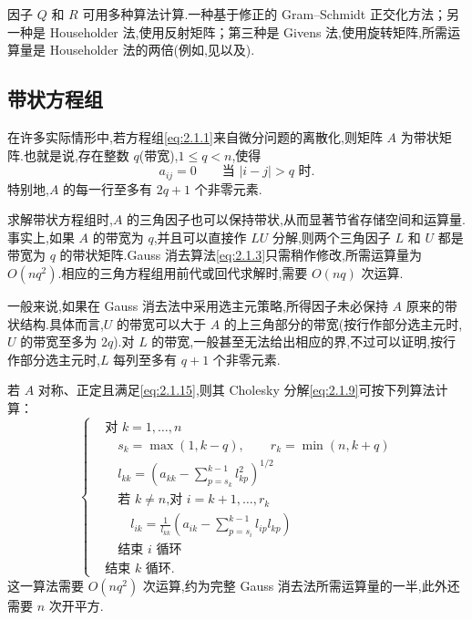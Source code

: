 因子 \(Q\) 和 \(R\) 可用多种算法计算.一种基于修正的 Gram--Schmidt 正交化方法；另一种是 Householder 法,使用反射矩阵；第三种是 Givens 法,使用旋转矩阵,所需运算量是 Householder 法的两倍(例如,见以及).

\subsection{带状方程组}\label{sec:2.1.1}

在许多实际情形中,若方程组\eqref{eq:2.1.1}来自微分问题的离散化,则矩阵 \(A\) 为带状矩阵.也就是说,存在整数 \(q\)(带宽),\(1\le q<n\),使得
\begin{equation}\label{eq:2.1.15}
  a_{ij}=0\qquad \text{当 }|i-j|>q\text{ 时.}
\end{equation}
特别地,\(A\) 的每一行至多有 \(2q+1\) 个非零元素.

求解带状方程组时,\(A\) 的三角因子也可以保持带状,从而显著节省存储空间和运算量.事实上,如果 \(A\) 的带宽为 \(q\),并且可以直接作 \(LU\) 分解,则两个三角因子 \(L\) 和 \(U\) 都是带宽为 \(q\) 的带状矩阵.Gauss 消去算法\eqref{eq:2.1.3}只需稍作修改,所需运算量为 \(O(nq^2)\).相应的三角方程组用前代或回代求解时,需要 \(O(nq)\) 次运算.

一般来说,如果在 Gauss 消去法中采用选主元策略,所得因子未必保持 \(A\) 原来的带状结构.具体而言,\(U\) 的带宽可以大于 \(A\) 的上三角部分的带宽(按行作部分选主元时,\(U\) 的带宽至多为 \(2q\)).对 \(L\) 的带宽,一般甚至无法给出相应的界,不过可以证明,按行作部分选主元时,\(L\) 每列至多有 \(q+1\) 个非零元素.

若 \(A\) 对称、正定且满足\eqref{eq:2.1.15},则其 Cholesky 分解\eqref{eq:2.1.9}可按下列算法计算：
\begin{equation}\label{eq:2.1.16}
  \left\{
  \begin{aligned}
    &\text{对 }k=1,\ldots,n\\
    &\quad s_k=\max(1,k-q),\qquad r_k=\min(n,k+q)\\
    &\quad l_{kk}=\left(a_{kk}-\sum_{p=s_k}^{k-1}l_{kp}^2\right)^{1/2}\\
    &\quad\text{若 \(k\ne n\),对 }i=k+1,\ldots,r_k\\
    &\qquad l_{ik}=\frac1{l_{kk}}\left(a_{ik}-\sum_{p=s_i}^{k-1}l_{ip}l_{kp}\right)\\
    &\quad\text{结束 \(i\) 循环}\\
    &\text{结束 \(k\) 循环.}
  \end{aligned}
  \right.
\end{equation}
这一算法需要 \(O(nq^2)\) 次运算,约为完整 Gauss 消去法所需运算量的一半,此外还需要 \(n\) 次开平方.

